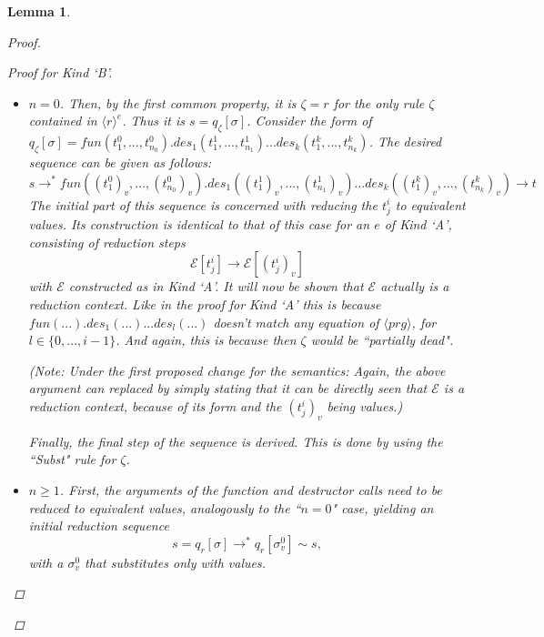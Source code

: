 \documentclass[11pt]{article} %
\newtheorem{lemma}{Lemma}
\begin{document}
\begin{lemma}
\begin{proof}
\begin{enumerate}
\begin{proof}[Proof for Kind `B']
\begin{itemize}
\item $n = 0$. Then, by the first common property, it is $\zeta = r$ for the only rule $\zeta$ contained in $\langle r \rangle^e$. Thus it is $s = q_\zeta[\sigma]$. Consider the form of $q_\zeta[\sigma] = fun(t^0_1, ..., t^0_{n_0}).des_1(t^1_1, ..., t^1_{n_1})...des_k(t^k_1, ..., t^k_{n_k})$. The desired sequence can be given as follows:
\begin{equation*}
s \longrightarrow^* fun((t^0_1)_v, ..., (t^0_{n_0})_v).des_1((t^1_1)_v, ..., (t^1_{n_1})_v)...des_k((t^k_1)_v, ..., (t^k_{n_k})_v) \longrightarrow t
\end{equation*}
The initial part of this sequence is concerned with reducing the $t^i_j$ to equivalent values. Its construction is identical to that of this case for an $e$ of Kind `A', consisting of reduction steps
\begin{equation*}
\mathcal{E}[t^i_j] \longrightarrow \mathcal{E}[(t^i_j)_v]
\end{equation*}
with $\mathcal{E}$ constructed as in Kind `A'. It will now be shown that $\mathcal{E}$ actually is a reduction context. Like in the proof for Kind `A' this is because $fun(...).des_1(...)...des_l(...)$ doesn't match any equation of $\langle prg \rangle$, for $l \in \{0, ..., i-1\}$. And again, this is because then $\zeta$ would be ``partially dead".

(Note: Under the first proposed change for the semantics: Again, the above argument can replaced by simply stating that it can be directly seen that $\mathcal{E}$ is a reduction context, because of its form and the $(t^i_j)_v$ being values.) 

Finally, the final step of the sequence is derived. This is done by using the ``Subst" rule for $\zeta$.

\item $n \geq 1$. First, the arguments of the function and destructor calls need to be reduced to equivalent values, analogously to the ``$n = 0$" case, yielding an initial reduction sequence
\begin{equation*}
s = q_r[\sigma] \longrightarrow^* q_r[\sigma^0_v] \sim s,
\end{equation*}
with a $\sigma^0_v$ that substitutes only with values.


\end{itemize}
\end{proof}
\end{enumerate}
\end{proof}
\end{lemma}
\end{document}
